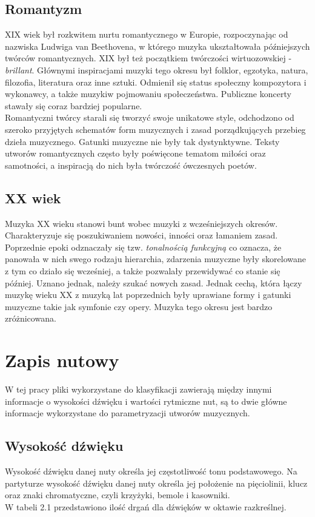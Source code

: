 \documentclass[printmode, eng, openany]{mgr}
\newcommand\tab[1][1cm]{\hspace*{#1}}
\begin{document}
\subsection{Romantyzm}
\tab XIX wiek był rozkwitem nurtu romantycznego w Europie, rozpoczynając od nazwiska Ludwiga van Beethovena, w którego muzyka ukształtowała późniejszych twórców romantycznych. XIX był też początkiem twórczości wirtuozowskiej - \textit{brillant}. Głównymi inspiracjami muzyki tego okresu był folklor, egzotyka, natura, filozofia, literatura oraz inne sztuki. Odmienił się status społeczny kompozytora i wykonawcy, a także muzyki\linebreak w pojmowaniu społeczeństwa. Publiczne koncerty stawały się coraz bardziej popularne.\\
\tab Romantyczni twórcy starali się tworzyć swoje unikatowe style, odchodzono od szeroko przyjętych schematów form muzycznych i zasad porządkujących przebieg dzieła muzycznego. Gatunki muzyczne nie były tak dystynktywne. Teksty utworów romantycznych często były poświęcone tematom miłości oraz samotności, a inspiracją do nich była twórczość ówczesnych poetów. \cite{rom}
\subsection{XX wiek}
\tab Muzyka XX wieku stanowi bunt wobec muzyki z wcześniejszych okresów. Charakteryzuje się poszukiwaniem nowości, inności oraz łamaniem zasad. Poprzednie epoki odznaczały się tzw. \textit{tonalnością funkcyjną} co oznacza, że panowała w nich swego rodzaju hierarchia, zdarzenia muzyczne były skorelowane z tym co działo się wcześniej, a także pozwalały przewidywać co stanie się później. Uznano jednak, należy szukać nowych zasad. Jednak cechą, która łączy muzykę wieku XX z muzyką lat poprzednich były uprawiane formy i gatunki muzyczne takie jak symfonie czy opery. Muzyka tego okresu jest bardzo zróżnicowana. \cite{xx}
\section{Zapis nutowy}
\tab W tej pracy pliki wykorzystane do klasyfikacji zawierają między innymi informacje o wysokości dźwięku i wartości rytmiczne nut, są to dwie główne informacje wykorzystane do parametryzacji utworów muzycznych.
\subsection{Wysokość dźwięku}
\tab Wysokość dźwięku danej nuty określa jej częstotliwość tonu podstawowego. Na partyturze wysokość dźwięku danej nuty określa jej położenie na pięciolinii, klucz oraz znaki chromatyczne, czyli krzyżyki, bemole i kasowniki.\\ W tabeli 2.1 przedstawiono ilość drgań dla dźwięków w oktawie razkreślnej. \cite{wys}
\end{document}
